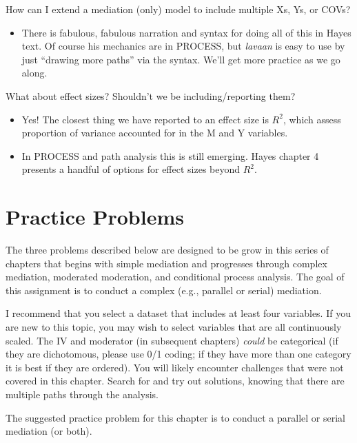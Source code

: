 \documentclass[
  11pt,
]{book}
\providecommand{\tightlist}{%
  \setlength{\itemsep}{0pt}\setlength{\parskip}{0pt}}
\begin{document}
How can I extend a mediation (only) model to include multiple Xs, Ys, or COVs?

\begin{itemize}
\tightlist
\item
  There is fabulous, fabulous narration and syntax for doing all of this in Hayes text. Of course his mechanics are in PROCESS, but \emph{lavaan} is easy to use by just ``drawing more paths'' via the syntax. We'll get more practice as we go along.
\end{itemize}

What about effect sizes? Shouldn't we be including/reporting them?

\begin{itemize}
\tightlist
\item
  Yes! The closest thing we have reported to an effect size is \(R^2\), which assess proportion of variance accounted for in the M and Y variables.\\
\item
  In PROCESS and path analysis this is still emerging. Hayes chapter 4 presents a handful of options for effect sizes beyond \(R^2\).
\end{itemize}

\hypertarget{practice-problems-5}{%
\section{Practice Problems}\label{practice-problems-5}}

The three problems described below are designed to be grow in this series of chapters that begins with simple mediation and progresses through complex mediation, moderated moderation, and conditional process analysis. The goal of this assignment is to conduct a complex (e.g., parallel or serial) mediation.

I recommend that you select a dataset that includes at least four variables. If you are new to this topic, you may wish to select variables that are all continuously scaled. The IV and moderator (in subsequent chapters) \emph{could} be categorical (if they are dichotomous, please use 0/1 coding; if they have more than one category it is best if they are ordered). You will likely encounter challenges that were not covered in this chapter. Search for and try out solutions, knowing that there are multiple paths through the analysis.

The suggested practice problem for this chapter is to conduct a parallel or serial mediation (or both).
\end{document}
